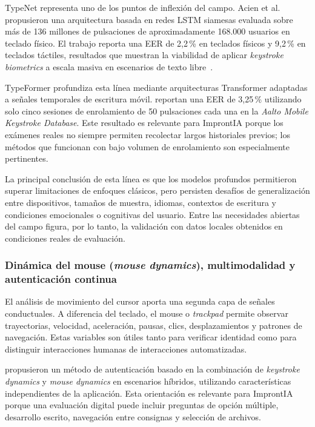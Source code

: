 TypeNet representa uno de los puntos de inflexión del campo. Acien et al. propusieron una arquitectura basada en redes LSTM siamesas evaluada sobre más de 136 millones de pulsaciones de aproximadamente 168.000 usuarios en teclado físico. El trabajo reporta una EER de 2,2\,\% en teclados físicos y 9,2\,\% en teclados táctiles, resultados que muestran la viabilidad de aplicar \textit{keystroke biometrics} a escala masiva en escenarios de texto libre~\parencite{Acien2022}.

TypeFormer profundiza esta línea mediante arquitecturas Transformer adaptadas a señales temporales de escritura móvil. \textcite{Stragapede2024} reportan una EER de 3,25\,\% utilizando solo cinco sesiones de enrolamiento de 50 pulsaciones cada una en la \textit{Aalto Mobile Keystroke Database}. Este resultado es relevante para ImprontIA porque los exámenes reales no siempre permiten recolectar largos historiales previos; los métodos que funcionan con bajo volumen de enrolamiento son especialmente pertinentes.

La principal conclusión de esta línea es que los modelos profundos permitieron superar limitaciones de enfoques clásicos, pero persisten desafíos de generalización entre dispositivos, tamaños de muestra, idiomas, contextos de escritura y condiciones emocionales o cognitivas del usuario. Entre las necesidades abiertas del campo figura, por lo tanto, la validación con datos locales obtenidos en condiciones reales de evaluación.

\subsubsection{Dinámica del mouse (\textit{mouse dynamics}), multimodalidad y autenticación continua}
El análisis de movimiento del cursor aporta una segunda capa de señales conductuales. A diferencia del teclado, el mouse o \textit{trackpad} permite observar trayectorias, velocidad, aceleración, pausas, clics, desplazamientos y patrones de navegación. Estas variables son útiles tanto para verificar identidad como para distinguir interacciones humanas de interacciones automatizadas.

\textcite{Yang2022} propusieron un método de autenticación basado en la combinación de \textit{keystroke dynamics} y \textit{mouse dynamics} en escenarios híbridos, utilizando características independientes de la aplicación. Esta orientación es relevante para ImprontIA porque una evaluación digital puede incluir preguntas de opción múltiple, desarrollo escrito, navegación entre consignas y selección de archivos.

